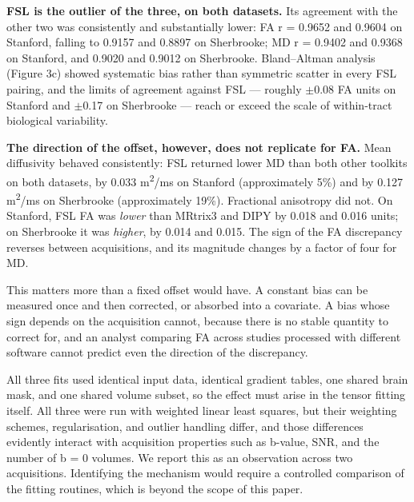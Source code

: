\documentclass[12pt,a4paper]{article}
\begin{document}
\textbf{FSL is the outlier of the three, on both datasets.} Its agreement with the other two was consistently and substantially lower: FA r = 0.9652 and 0.9604 on Stanford, falling to 0.9157 and 0.8897 on Sherbrooke; MD r = 0.9402 and 0.9368 on Stanford, and 0.9020 and 0.9012 on Sherbrooke. Bland--Altman analysis (Figure 3c) showed systematic bias rather than symmetric scatter in every FSL pairing, and the limits of agreement against FSL --- roughly $\pm$0.08 FA units on Stanford and $\pm$0.17 on Sherbrooke --- reach or exceed the scale of within-tract biological variability.

\textbf{The direction of the offset, however, does not replicate for FA.} Mean diffusivity behaved consistently: FSL returned lower MD than both other toolkits on both datasets, by 0.033 \textmu{}m\textsuperscript{2}/ms on Stanford (approximately 5\%) and by 0.127 \textmu{}m\textsuperscript{2}/ms on Sherbrooke (approximately 19\%). Fractional anisotropy did not. On Stanford, FSL FA was \emph{lower} than MRtrix3 and DIPY by 0.018 and 0.016 units; on Sherbrooke it was \emph{higher}, by 0.014 and 0.015. The sign of the FA discrepancy reverses between acquisitions, and its magnitude changes by a factor of four for MD.

This matters more than a fixed offset would have. A constant bias can be measured once and then corrected, or absorbed into a covariate. A bias whose sign depends on the acquisition cannot, because there is no stable quantity to correct for, and an analyst comparing FA across studies processed with different software cannot predict even the direction of the discrepancy.

All three fits used identical input data, identical gradient tables, one shared brain mask, and one shared volume subset, so the effect must arise in the tensor fitting itself. All three were run with weighted linear least squares, but their weighting schemes, regularisation, and outlier handling differ, and those differences evidently interact with acquisition properties such as b-value, SNR, and the number of b = 0 volumes. We report this as an observation across two acquisitions. Identifying the mechanism would require a controlled comparison of the fitting routines, which is beyond the scope of this paper.
\end{document}
